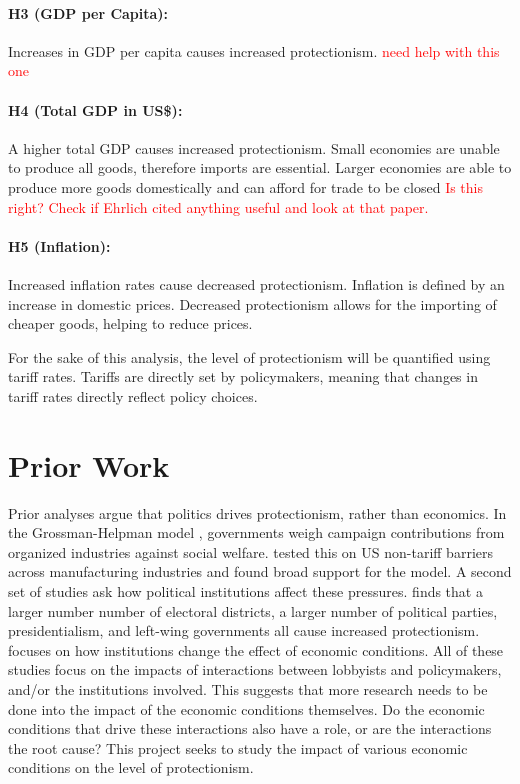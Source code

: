 \documentclass[11pt]{article}
\begin{document}
{\paragraph{H3 (GDP per Capita):} Increases in GDP per capita causes increased protectionism. \textcolor{red}{need help with this one}

\paragraph{H4 (Total GDP in US\$):} A higher total GDP causes increased protectionism. Small economies are unable to produce all goods, therefore imports are essential. Larger economies are able to produce more goods domestically and can afford for trade to be closed \textcolor{red}{Is this right? Check if Ehrlich cited anything useful and look at that paper.} 

\paragraph{H5 (Inflation):} Increased inflation rates cause decreased protectionism. Inflation is defined by an increase in domestic prices. Decreased protectionism allows for the importing of cheaper goods, helping to reduce prices. 

\noindent For the sake of this analysis, the level of protectionism will be quantified using tariff rates. Tariffs are directly set by policymakers, meaning that changes in tariff rates directly reflect policy choices. 



\section{Prior Work}

Prior analyses argue that politics drives protectionism, rather than economics. In the Grossman-Helpman model \citep{GH_Model}, governments weigh campaign contributions from organized industries against social welfare. \cite{Gawande2000} tested this on US non-tariff barriers across manufacturing industries and found broad support for the model. A second set of studies ask how political institutions affect these pressures. \cite{Ehrlich2007} finds that a larger number number of electoral districts, a larger number of political parties, presidentialism, and left-wing governments all cause increased protectionism. \cite{HeniszMansfield2006} focuses on how institutions change the effect of economic conditions. All of these studies focus on the impacts of interactions between lobbyists and policymakers, and/or the institutions involved. This suggests that more research needs to be done into the impact of the economic conditions themselves. Do the economic conditions that drive these interactions also have a role, or are the interactions the root cause? This project seeks to study the impact of various economic conditions on the level of protectionism. 

}
\end{document}
